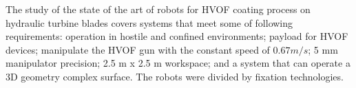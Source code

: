 The study of the state of the art of robots for HVOF coating process on
hydraulic turbine blades covers systems that meet some of following requirements:
operation in hostile and confined environments; payload for HVOF devices;
manipulate the HVOF gun with the constant speed of $0.67 m/s$; 5 mm
manipulator precision; 2.5 m x 2.5 m workspace; and a system that can operate
a 3D geometry complex surface. The robots were divided by fixation technologies.


